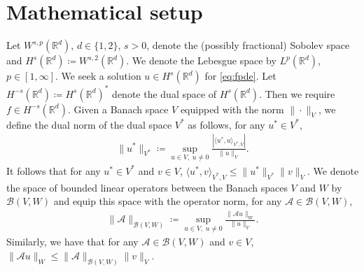 \documentclass[10pt,a4paper]{article}
\numberwithin{equation}{section}
\begin{document}
\section{Mathematical setup}
\label{sec:setup}

Let $W^{s,p}(\mathbb{R}^d)$, $d \in \{1,2\}$, $s>0$, denote the (possibly fractional) Sobolev space \cite{Adams2003,Di2012} and $H^{s}(\mathbb{R}^d) \coloneqq W^{s,2}(\mathbb{R}^d)$. We denote the Lebesgue space by  $L^p(\mathbb{R}^d)$, $p \in [1,\infty]$.  We seek a solution $u \in H^{s}(\mathbb{R}^d)$ for \cref{eq:fpde}. Let $H^{-s}(\mathbb{R}^d) \coloneqq H^s(\mathbb{R}^d)^*$ denote the dual space of $H^s(\mathbb{R}^d)$. Then we require $f \in H^{-s}(\mathbb{R}^d)$. Given a Banach space $V$ equipped with the norm $\| \cdot \|_V$, we define the dual norm of the dual space $V^*$ as follows, for any $u^* \in V^*$,
\begin{align}
\| u^* \|_{V^*} \coloneqq \sup_{u \in V, \; u \neq 0} \frac{|\langle u^*, u \rangle_{V^*, V}|}{\| u \|_V}.
\end{align}
It follows that for any $u^* \in V^*$ and $v \in V$, $\langle u^*, v \rangle_{V^*, V} \leq \| u^*\|_{V^*} \| v \|_V$. We denote the space of bounded linear operators between the Banach spaces $V$ and $W$ by $\mathcal{B}(V, W)$ and equip this space with the operator norm, for any $\mathcal{A} \in \mathcal{B}(V,W)$,
\begin{align}
\| \mathcal{A} \|_{\mathcal{B}(V,W)} \coloneqq \sup_{u \in V, \; u \neq 0} \frac{\| \mathcal{A}u \|_W}{\| u \|_V}.
\end{align}
Similarly, we have that for any $\mathcal{A} \in  \mathcal{B}(V,W)$ and $v \in V$, $\| \mathcal{A}u \|_W \leq \| \mathcal{A} \|_{\mathcal{B}(V,W)} \|v\|_V$. 
\end{document}
